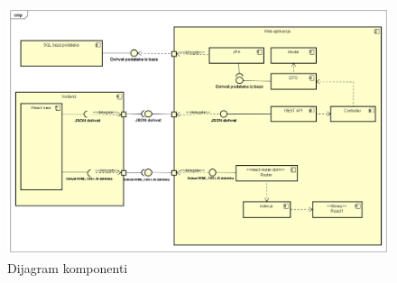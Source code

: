 		\begin{figure}[H]
			\includegraphics[scale=0.4]{dijagrami/dijagramKomponenti} %
			\centering
			\caption{Dijagram komponenti}
			\label{fig:dijagramKomponenti}
		\end{figure}
		
		
